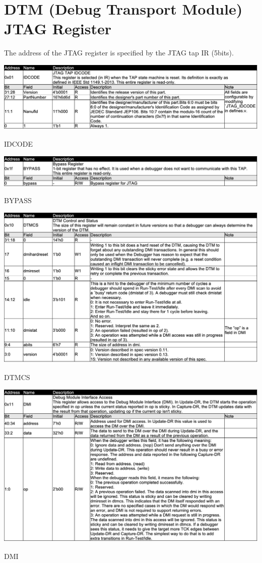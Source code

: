 \section{DTM (Debug Transport Module) JTAG Register}

The address of the JTAG register is specified by the JTAG tap IR (5bits).

\begin{table}[H]
    \includegraphics[width=1.00\columnwidth]{./Table/IDCODE.png}
    \caption{IDCODE}
    \label{tb:IDCODE}
\end{table}

\begin{table}[H]
    \includegraphics[width=1.00\columnwidth]{./Table/BYPASS.png}
    \caption{BYPASS}
    \label{tb:BYPASS}
\end{table}

\begin{table}[H]
    \includegraphics[width=1.00\columnwidth]{./Table/DTMCS.png}
    \caption{DTMCS}
    \label{tb:DTMCS}
\end{table}

\begin{table}[H]
    \includegraphics[width=1.00\columnwidth]{./Table/DMI.png}
    \caption{DMI}
    \label{tb:DMI}
\end{table}

